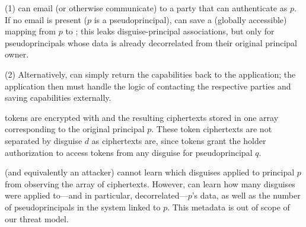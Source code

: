 (1) \sys can email (or otherwise communicate)
 to a party that can authenticate as $p$. If no email is present (\eg $p$ is a pseudoprincipal),
\sys can save a (globally accessible) mapping from $p$ to ; this leaks disguise-principal associations, but
only for pseudoprincipals whose data is already decorrelated from their original principal owner.

(2) Alternatively, \sys can simply return the capabilities back to the application; the application
then must handle the logic of contacting the respective parties and saving capabilities externally.

 tokens are encrypted with  and the resulting ciphertexts stored in one array
corresponding to the original principal $p$. These token ciphertexts are not separated by disguise
$d$ as  ciphertexts are, since  tokens grant the holder authorization to access
tokens from any disguise for pseudoprincipal $q$.

\sys (and equivalently an attacker) cannot learn which disguises applied to principal $p$ from
observing the array of  ciphertexts. However, \sys can learn how many disguises were
applied to---and in particular, decorrelated---$p$'s data, as well as the number of pseudoprincipals
in the system linked to $p$. This metadata is out of scope of our threat model.

